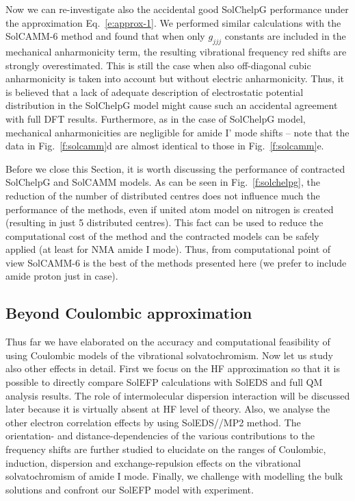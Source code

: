 \documentclass[a4paper,titlepage,twoside,fleqn,12pt]{book}
\begin{document}
\begin{refsection}
Now we can re-investigate also the accidental good SolChelpG performance under the
approximation Eq.~\eqref{e:approx-1}. We performed similar 
calculations with the SolCAMM-6 method and found that when only $g_{jjj}$
constants are included in the mechanical anharmonicity term, 
the resulting vibrational frequency red shifts are strongly overestimated.
This is still the case when also off\hyp{}diagonal cubic anharmonicity
is taken into account but without electric anharmonicity.
Thus, it is believed that a lack of adequate description
of electrostatic potential distribution in the SolChelpG
model might cause such an accidental agreement with full DFT results. Furthermore,
as in the case of SolChelpG model, mechanical
anharmonicities are negligible for amide I' mode shifts -- note
that the data in Fig.~\ref{f:solcamm}d are almost identical to those in
Fig.~\ref{f:solcamm}e.

Before we close this Section, it is worth discussing 
the performance of contracted SolChelpG and
SolCAMM models. As can be seen in Fig.~\ref{f:solchelpg}, 
the reduction of the number of distributed centres
does not influence much the performance of the methods, even if united atom 
model on nitrogen is created (resulting in just 5 distributed centres). 
This fact can be used to reduce the computational cost of the method
and the contracted models can be safely applied (at least for NMA amide I mode).
Thus, from computational point of view SolCAMM-6 is the best of the methods
presented here (we prefer to include amide proton just in case).

\subsection{Beyond Coulombic approximation}

Thus far we have elaborated on the accuracy and computational
feasibility of using Coulombic models of the vibrational solvatochromism.
Now let us study also other effects in detail.
First we focus on the HF approximation
so that it is possible to directly compare SolEFP calculations
with SolEDS and full QM analysis results. The role of intermolecular dispersion interaction
will be discussed later because it is virtually absent
at HF level of theory. Also, we analyse the other electron correlation
effects by using SolEDS//MP2 method. The orientation\hyp{}
and distance\hyp{}dependencies of the various contributions
to the frequency shifts are further studied to elucidate on
the ranges of Coulombic, induction, dispersion and exchange\hyp{}repulsion
effects on the vibrational solvatochromism of amide I mode.
Finally, we challenge with modelling the bulk solutions
and confront our SolEFP model with experiment.


\end{refsection}
\end{document}
